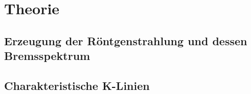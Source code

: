 \section{Theorie}
\label{sec:Theorie}

\subsection{Erzeugung der Röntgenstrahlung und dessen Bremsspektrum}

\subsection{Charakteristische K-Linien}

